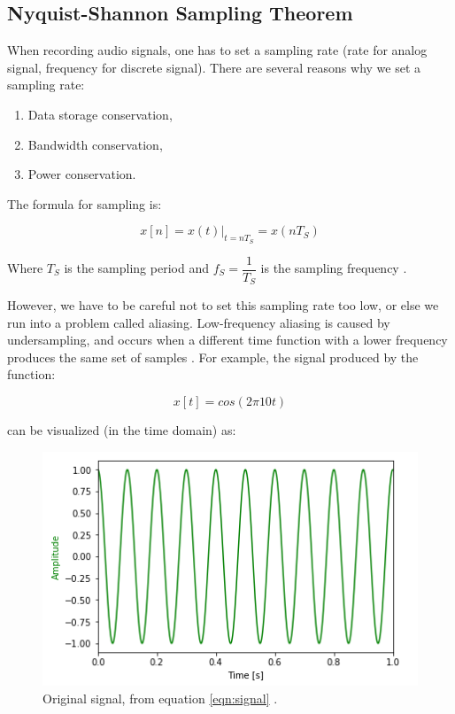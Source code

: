 \subsection{Nyquist-Shannon Sampling Theorem}

When recording audio signals, one has to set a sampling rate
(rate for analog signal, frequency for discrete signal). There
are several reasons why we set a sampling rate:

\begin{enumerate}
	\item Data storage conservation,
	\item Bandwidth conservation,
	\item Power conservation.
\end{enumerate}

The formula for sampling is:

\begin{equation}
	x[n]=x(t)|_{t=nT_{S}}=x(nT_{S})
	\label{eqn:signal}
\end{equation}

Where \(T_{S}\) is the sampling period and \(f_{S}=
\dfrac{1}{T_{S}}\) is the sampling frequency 
\cite{notes:class}.

However, we have to be careful not to set this sampling rate too
low, or else we run into a problem called aliasing. Low-frequency
aliasing is caused by undersampling, and occurs when a different
time function with a lower frequency produces the same set of
samples \cite{aliase:wiki}. For example, the signal produced by
the function:

\begin{equation}
	x[t]=cos(2\pi10t)
\end{equation}

can be visualized (in the time domain) as:

\begin{figure}[H]
	\centering
	\includegraphics[scale = 1]{images/original_signal.png} %
	\caption{Original signal, from equation \ref{eqn:signal} \cite{notebook:sampling}.}
	\label{fig:signal_og}
\end{figure}    

